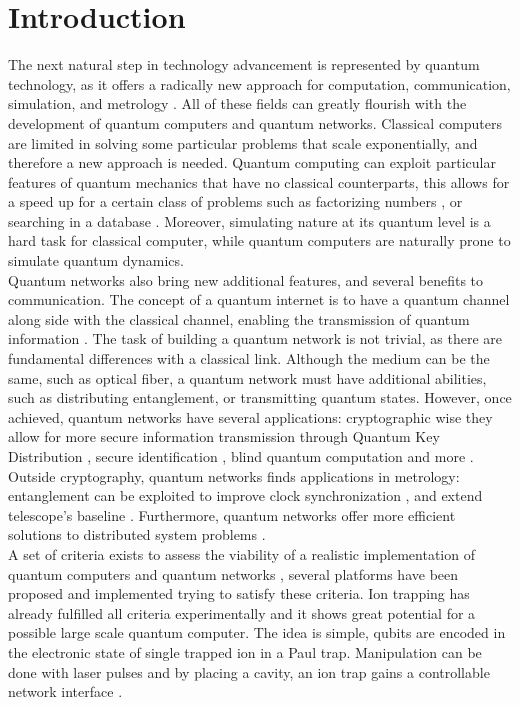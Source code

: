 \documentclass[english, a4paper, 12pt, twoside]{book}
\numberwithin{equation}{section} %
\begin{document}
\chapter{Introduction} %
The next natural step in technology advancement is represented by quantum technology, as it offers a radically new approach for computation, communication, simulation, and metrology \cite{quantumtech}. All of these fields can greatly flourish with the development of quantum computers and quantum networks. Classical computers are limited in solving some particular problems that scale exponentially, and therefore a new approach is needed. Quantum computing can exploit particular features of quantum mechanics that have no classical counterparts, this allows for a speed up for a certain class of problems such as factorizing numbers \cite{shor}, or searching in a database \cite{grover}. Moreover, simulating nature at its quantum level is a hard task for classical computer, while quantum computers are naturally prone to simulate quantum dynamics.\\
Quantum networks also bring new additional features, and several benefits to communication. The concept of a quantum internet is to have a quantum channel along side with the classical channel, enabling the transmission of quantum information \cite{Wehnereaam9288}. The task of building a quantum network is not trivial, as there are fundamental differences with a classical link. Although the medium can be the same, such as optical fiber, a quantum network must have additional abilities, such as distributing entanglement, or transmitting quantum states. However, once achieved, quantum networks have several applications: cryptographic wise they allow for more secure information transmission through Quantum Key Distribution \cite{qkd2}, secure identification \cite{secureident}, blind quantum computation \cite{blindcomputation} and more \cite{Wehnereaam9288}. Outside cryptography, quantum networks finds applications in metrology: entanglement can be exploited to improve clock synchronization \cite{quantumclocks},
and extend telescope's baseline  \cite{telescope}. Furthermore, quantum networks offer more efficient solutions to distributed system problems \cite{distributedcomputing}.\\
A set of criteria exists to assess the viability of a realistic implementation of quantum computers and quantum networks \cite{divincenzo}, several platforms have been proposed and implemented trying to satisfy these criteria. Ion trapping has already fulfilled all criteria experimentally \cite{trappedions} and it shows great potential for a possible large scale quantum computer. The idea is simple, qubits are encoded in the electronic state of single trapped ion in a Paul trap. Manipulation can be done with laser pulses \cite{ionquantumcomputer} and by placing a cavity, an ion trap gains a controllable network interface \cite{stuteinterface}.\\
\end{document}

